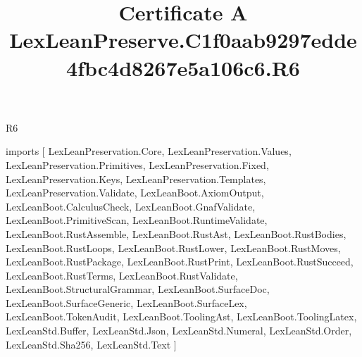 \begin{lexlean}{R6}
\title{Certificate A LexLeanPreserve.C1f0aab9297edde4fbc4d8267e5a106c6.R6}
\begin{coremodule}
imports [
  LexLeanPreservation.Core,
  LexLeanPreservation.Values,
  LexLeanPreservation.Primitives,
  LexLeanPreservation.Fixed,
  LexLeanPreservation.Keys,
  LexLeanPreservation.Templates,
  LexLeanPreservation.Validate,
  LexLeanBoot.AxiomOutput,
  LexLeanBoot.CalculusCheck,
  LexLeanBoot.GnafValidate,
  LexLeanBoot.PrimitiveScan,
  LexLeanBoot.RuntimeValidate,
  LexLeanBoot.RustAssemble,
  LexLeanBoot.RustAst,
  LexLeanBoot.RustBodies,
  LexLeanBoot.RustLoops,
  LexLeanBoot.RustLower,
  LexLeanBoot.RustMoves,
  LexLeanBoot.RustPackage,
  LexLeanBoot.RustPrint,
  LexLeanBoot.RustSucceed,
  LexLeanBoot.RustTerms,
  LexLeanBoot.RustValidate,
  LexLeanBoot.StructuralGrammar,
  LexLeanBoot.SurfaceDoc,
  LexLeanBoot.SurfaceGeneric,
  LexLeanBoot.SurfaceLex,
  LexLeanBoot.TokenAudit,
  LexLeanBoot.ToolingAst,
  LexLeanBoot.ToolingLatex,
  LexLeanStd.Buffer,
  LexLeanStd.Json,
  LexLeanStd.Numeral,
  LexLeanStd.Order,
  LexLeanStd.Sha256,
  LexLeanStd.Text
]


\end{coremodule}
\end{lexlean}
